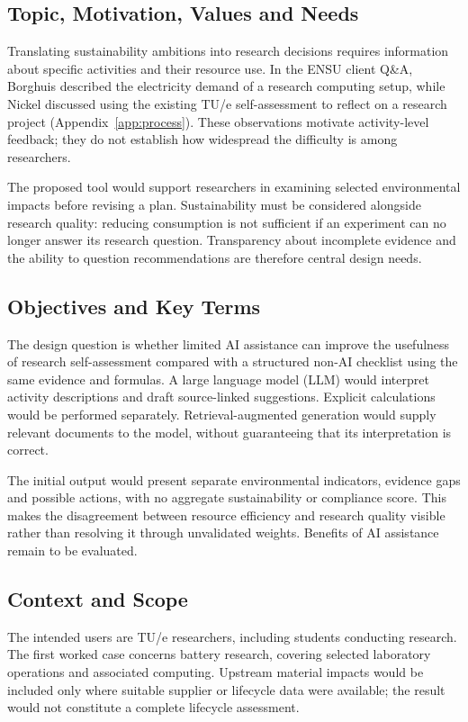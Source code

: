 \documentclass[11pt,a4paper]{article}
\begin{document}
\subsection{Topic, Motivation, Values and Needs}
Translating sustainability ambitions into research decisions requires information about specific activities and their resource use. In the ENSU client Q\&A, Borghuis described the electricity demand of a research computing setup, while Nickel discussed using the existing TU/e self-assessment to reflect on a research project (Appendix~\ref{app:process}). These observations motivate activity-level feedback; they do not establish how widespread the difficulty is among researchers.

The proposed tool would support researchers in examining selected environmental impacts before revising a plan. Sustainability must be considered alongside research quality: reducing consumption is not sufficient if an experiment can no longer answer its research question. Transparency about incomplete evidence and the ability to question recommendations are therefore central design needs.

\subsection{Objectives and Key Terms}
The design question is whether limited AI assistance can improve the usefulness of research self-assessment compared with a structured non-AI checklist using the same evidence and formulas. A large language model (LLM) would interpret activity descriptions and draft source-linked suggestions. Explicit calculations would be performed separately. Retrieval-augmented generation would supply relevant documents to the model, without guaranteeing that its interpretation is correct.

The initial output would present separate environmental indicators, evidence gaps and possible actions, with no aggregate sustainability or compliance score. This makes the disagreement between resource efficiency and research quality visible rather than resolving it through unvalidated weights. Benefits of AI assistance remain to be evaluated.

\subsection{Context and Scope}
The intended users are TU/e researchers, including students conducting research. The first worked case concerns battery research, covering selected laboratory operations and associated computing. Upstream material impacts would be included only where suitable supplier or lifecycle data were available; the result would not constitute a complete lifecycle assessment.
\end{document}
